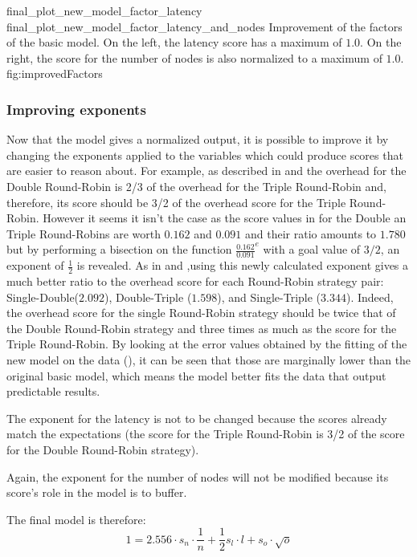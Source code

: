 \doublefigure
    {final_plot_new_model_factor_latency}
    {final_plot_new_model_factor_latency_and_nodes}
    {Improvement of the factors of the basic model. On the left, the latency
    score has a maximum of \(1.0\). On the right, the score for the number of nodes
    is also normalized to a maximum of \(1.0\).
    }
    {fig:improvedFactors}


\subsubsection{Improving exponents}
Now that the model gives a normalized output, it is possible to improve it by
changing the exponents applied to the variables which could produce scores that
are easier to reason about. For example, as described in 
and  the
overhead for the Double Round-Robin is 2/3 of the overhead for the Triple
Round-Robin and, therefore, its score should be 3/2 of the overhead score for the
Triple Round-Robin. 
However it seems it isn't the case as the score values in 
for the Double an Triple Round-Robins are worth $0.162$ and $0.091$ and their
ratio amounts to $1.780$ but by performing a bisection on the function
\(\frac{0.162}{0.091}^e\) with a goal value of $3/2$, an exponent of
\(\frac{1}{2}\) is revealed.
As in  and ,using this newly
calculated exponent gives a much better ratio to the overhead score for each
Round-Robin strategy pair: Single-Double($2.092$), Double-Triple ($1.598$), and
Single-Triple ($3.344$).
Indeed, the overhead score for the single Round-Robin strategy
should be twice that of the Double Round-Robin strategy and three times as
much as the score for the Triple Round-Robin. By looking at the error values
obtained by the fitting of the new model on the data
(), it can be seen that those are marginally lower than
the original basic model, which means the model better fits the data that output
predictable results. 

The exponent for the latency is not to be changed because the scores already
match the expectations (the score for the Triple Round-Robin is 3/2 of the score
for the Double Round-Robin strategy). 

Again, the exponent for the number of nodes will not be modified because its
score's role in the model is to buffer.

The final model is therefore: 
\[1 = 2.556\cdot s_n \cdot \frac{1}{n} + \frac{1}{2} s_l\cdot l + s_o\cdot
\sqrt{o}\]


